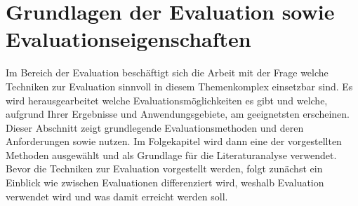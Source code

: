 \documentclass[draft=false
              ,paper=a4
              ,twoside=false
              ,fontsize=11pt
              ,headsepline
              ,BCOR10mm
              ,DIV11
              ]{scrbook}
\begin{document}
\section{Grundlagen der Evaluation sowie Evaluationseigenschaften} %
\label{sec:grundlagen_der_evaluation_sowie_evaluationseigenschaften}
Im Bereich der Evaluation beschäftigt sich die Arbeit mit der Frage welche Techniken zur Evaluation sinnvoll in diesem Themenkomplex einsetzbar sind. Es wird herausgearbeitet welche Evaluationsmöglichkeiten es gibt und welche, aufgrund Ihrer Ergebnisse und Anwendungsgebiete, am geeignetsten erscheinen. Dieser Abschnitt zeigt grundlegende Evaluationsmethoden und deren Anforderungen sowie nutzen. Im Folgekapitel wird dann eine der vorgestellten Methoden ausgewählt und als Grundlage für die Literaturanalyse verwendet.
Bevor die Techniken zur Evaluation vorgestellt werden, folgt zunächst ein Einblick wie zwischen Evaluationen differenziert wird, weshalb Evaluation verwendet wird und was damit erreicht werden soll.
\end{document}
